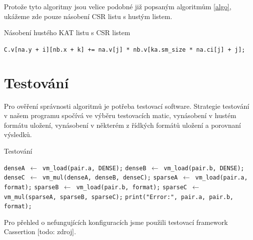 Protože tyto algoritmy jsou velice podobné již popsaným algoritmům \ref{algo}, ukážeme zde pouze násobení CSR listu s hustým listem.

\begin{algorithm}[htb]
	\caption{Násobení hustého KAT listu s CSR listem}\label{kat-mmm-den-csr}
	\begin{algorithmic}[1]
					\State \texttt{C.v[na.y + i][nb.x + k] += na.v[j] * nb.v[ka.sm\_size * na.ci[j] + j];}
				\EndFor
			\EndFor
		\EndFor
		\EndProcedure
	\end{algorithmic}
\end{algorithm}



\section{Testování}

Pro ověření správnosti algoritmů je potřeba testovací software. Strategie testování v našem programu spočívá ve výběru testovacích matic, vynásobení v hustém formátu uložení, vynásobení v některém z řídkých formátů uložení a porovnaní výsledků.

\begin{algorithm}[htb]
	\caption{Testování}\label{testing}
	\begin{algorithmic}[1]
				\State \texttt{denseA $\gets$ vm\_load(pair.a, DENSE);}
				\State \texttt{denseB $\gets$ vm\_load(pair.b, DENSE);}
				\State \texttt{denseC $\gets$ vm\_mul(denseA, denseB, denseC);}
				\State \texttt{sparseA $\gets$ vm\_load(pair.a, format);}
				\State \texttt{sparseB $\gets$ vm\_load(pair.b, format);}
				\State \texttt{sparseC $\gets$ vm\_mul(sparseA, sparseB, sparseC);}
					\State \texttt{print("Error:", pair.a, pair.b, format);}
				\EndIf
			\EndFor
		\EndFor
		\EndProcedure
	\end{algorithmic}
\end{algorithm}

Pro přehled o nefungujících konfiguracích jsme použili testovací framework Cassertion [todo: zdroj].

